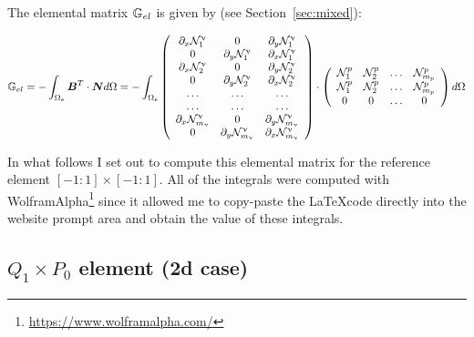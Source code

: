 


The elemental matrix ${\mathbb{G}}_{el}$ is given by (see Section~\ref{sec:mixed}):

\[
{\mathbb{G}}_{el} = -\int_{\Omega_e} {\bm B}^T \cdot {\bm N} d\Omega
= -\int_{\Omega_e}
\left(
\begin{array}{ccc}
\partial_x {\mathcal{N}}_1^\upnu & 0 & \partial_y {\mathcal{N}}_1^\upnu \\
0 & \partial_y {\mathcal{N}}_1^\upnu & \partial_x {\mathcal{N}}_1^\upnu \\
\partial_x {\mathcal{N}}_2^\upnu & 0 & \partial_y {\mathcal{N}}_2^\upnu \\
0 & \partial_y {\mathcal{N}}_2^\upnu & \partial_x {\mathcal{N}}_2^\upnu \\
\dots & \dots & \dots \\
\dots & \dots & \dots \\
\partial_x {\mathcal{N}}_{m_\upnu}^\upnu & 0 & \partial_y {\mathcal{N}}_{m_\upnu}^\upnu \\
0 & \partial_y {\mathcal{N}}_{m_\upnu}^\upnu & \partial_x {\mathcal{N}}_{m_\upnu}^\upnu 
\end{array}
\right)
\cdot
\left(
\begin{array}{cccc}
{\mathcal{N}}_1^p & {\mathcal{N}}_2^p & \dots & {\mathcal{N}}_{m_p}^p \\ 
{\mathcal{N}}_1^p & {\mathcal{N}}_2^p & \dots & {\mathcal{N}}_{m_p}^p \\ 
0 & 0 & \dots & 0
\end{array}
\right)
d\Omega
\]

In what follows I set out to compute this elemental matrix for the reference element $[-1:1]\times[-1:1]$.
All of the integrals were computed with WolframAlpha\footnote{\url{https://www.wolframalpha.com/}} 
since it allowed me to copy-paste
the \LaTeX code directly into the website prompt area and obtain the value of these integrals.


\subsection{$Q_1\times P_0$ element (2d case)}

